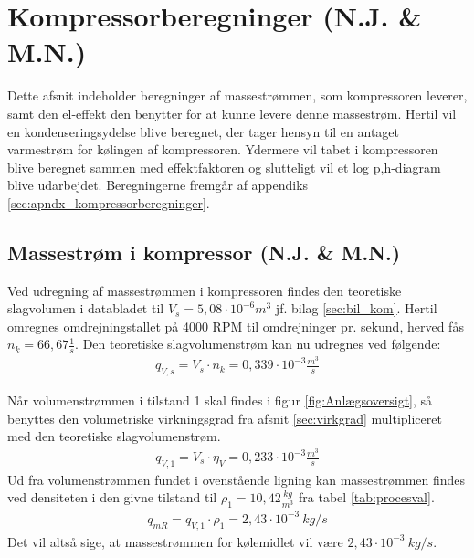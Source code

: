 \documentclass[../Hovedrapport.tex]{subfiles}
\begin{document}

\section{Kompressorberegninger (N.J. \& M.N.)} 
    \label{sec:indledendeberegninger}
Dette afsnit indeholder beregninger af massestrømmen, som kompressoren leverer, samt den el-effekt den benytter for at kunne levere denne massestrøm. Hertil vil en kondenseringsydelse blive beregnet, der tager hensyn til en antaget varmestrøm for kølingen af kompressoren. Ydermere vil tabet i kompressoren blive beregnet sammen med effektfaktoren og slutteligt vil et log p,h-diagram blive udarbejdet. 
Beregningerne fremgår af appendiks \ref{sec:apndx_kompressorberegninger}.
\subsection{Massestrøm i kompressor (N.J. \& M.N.)}
\label{sec:masse}
Ved udregning af massestrømmen i kompressoren  findes den teoretiske slagvolumen i databladet til $ V_s= 5,08\cdot 10^{-6} \si{m^3} $ jf. bilag \ref{sec:bil_kom}. Hertil omregnes omdrejningstallet på 4000 RPM til omdrejninger pr. sekund, herved fås $ n_k=66,67 \frac{1}{s} $. Den teoretiske slagvolumenstrøm kan nu udregnes ved følgende:
\begin{align}
    q_{V,s}=V_s \cdot n_k =0,339 \cdot 10^{-3} \si{\frac{m^3}{s}} 
\end{align}

Når volumenstrømmen i tilstand 1 skal findes i figur \ref{fig:Anlægsoversigt}, så benyttes den volumetriske virkningsgrad fra afsnit \ref{sec:virkgrad} multipliceret med den teoretiske slagvolumenstrøm.
\begin{align}
    q_{V,1}=V_s \cdot \eta_V = 0,233 \cdot 10^{-3} \si{\frac{m^3}{s}}
\end{align}
Ud fra volumenstrømmen fundet i ovenstående ligning kan massestrømmen findes ved densiteten i den givne tilstand til $\rho_1=10,42\si{\frac{kg}{m^3}}$ fra tabel \ref{tab:procesval}.
\begin{align}
    q_{mR}=q_{V,1} \cdot \rho_1 = 2,43\cdot 10^{-3} \SI{}{kg/s}
\end{align}
Det vil altså sige, at massestrømmen for kølemidlet vil være $2,43\cdot 10^{-3} \SI{}{kg/s}$.
\end{document}

